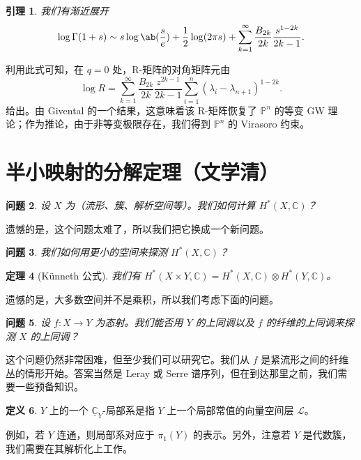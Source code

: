 \documentclass{amsart}
\newtheorem{thm}{定理}[section]
\newtheorem{lem}[thm]{引理}
\newtheorem{quest}[thm]{问题}
\theoremstyle{definition}
\newtheorem{defn}[thm]{定义}
\theoremstyle{remark}
\theoremstyle{plain}
\theoremstyle{definition}
\theoremstyle{remark}
\newcommand{\C}{\mathbb{C}}
\renewcommand{\P}{\mathbb{P}}
\newcommand{\mc}[1]{\mathcal{#1}}
\newcommand{\ul}[1]{\underline{#1}}
\newcommand{\1}{\mathbf{1}}
\newcommand{\2}{\mathbf{2}}
\newcommand{\3}{\mathbf{3}}
\begin{document}
\begin{lem}
    我们有渐近展开
    \[ \log \Gamma(1+s) \sim s \log \ab(\frac{s}{e}) + \frac{1}{2} \log(2\pi s) + \sum_{k=1}^{\infty} \frac{B_{2k}}{2k} \frac{s^{1-2k}}{2k-1}. \]
\end{lem}
利用此式可知，在 \(q = 0\) 处，R-矩阵的对角矩阵元由
\[ \log R = \sum_{k=1}^{\infty} \frac{B_{2k}}{2k} \frac{z^{2k-1}}{2k-1} \sum_{i =1}^n (\lambda_i - \lambda_{n+1})^{1-2k}. \]
给出。由 Givental 的一个结果，这意味着该 R-矩阵恢复了 \(\P^n\) 的等变 GW 理论；作为推论，由于非等变极限存在，我们得到 \(\P^n\) 的 Virasoro 约束。

\section{半小映射的分解定理（文学清）}%
\label{sec:Decomposition theorem for semi-small maps (Xueqing Wen)}

\begin{quest}
    设 \(X\) 为（流形、簇、解析空间等）。我们如何计算 \(H^*(X, \C)\)？
\end{quest}

遗憾的是，这个问题太难了，所以我们把它换成一个新问题。

\begin{quest}
    我们如何用更小的空间来探测 \(H^*(X, \C)\)？
\end{quest}

\begin{thm}[K\"unneth 公式]
    我们有 \(H^*(X \times Y, \C) = H^*(X, \C) \otimes H^*(Y, \C)\)。
\end{thm}

遗憾的是，大多数空间并不是乘积，所以我们考虑下面的问题。

\begin{quest}
    设 \(f \colon X \to Y\) 为态射。我们能否用 \(Y\) 的上同调以及 \(f\) 的纤维的上同调来探测 \(X\) 的上同调？
\end{quest}

这个问题仍然非常困难，但至少我们可以研究它。我们从 \(f\) 是紧流形之间的纤维丛的情形开始。答案当然是 Leray 或 Serre 谱序列，但在到达那里之前，我们需要一些预备知识。

\begin{defn}
    \(Y\) 上的一个 \(\ul{\C}_Y\)-局部系是指 \(Y\) 上一个局部常值的向量空间层 \(\mc{L}\)。
\end{defn}

例如，若 \(Y\) 连通，则局部系对应于 \(\pi_1(Y)\) 的表示。另外，注意若 \(Y\) 是代数簇，我们需要在其解析化上工作。
\end{document}
